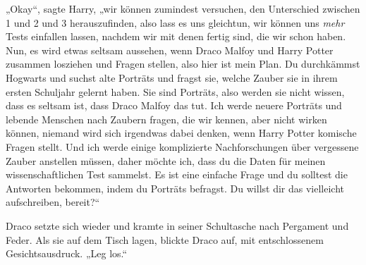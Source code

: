 „Okay“, sagte Harry, „wir können zumindest versuchen, den Unterschied zwischen 1 und 2 und 3 herauszufinden, also lass es uns gleichtun, wir können uns \emph{mehr} Tests einfallen lassen, nachdem wir mit denen fertig sind, die wir schon haben. Nun, es wird etwas seltsam aussehen, wenn Draco Malfoy und Harry Potter zusammen losziehen und Fragen stellen, also hier ist mein Plan. Du durchkämmst Hogwarts und suchst alte Porträts und fragst sie, welche Zauber sie in ihrem ersten Schuljahr gelernt haben. Sie sind Porträts, also werden sie nicht wissen, dass es seltsam ist, dass Draco Malfoy das tut. Ich werde neuere Porträts und lebende Menschen nach Zaubern fragen, die wir kennen, aber nicht wirken können, niemand wird sich irgendwas dabei denken, wenn Harry Potter komische Fragen stellt. Und ich werde einige komplizierte Nachforschungen über vergessene Zauber anstellen müssen, daher möchte ich, dass du die Daten für meinen wissenschaftlichen Test sammelst. Es ist eine einfache Frage und du solltest die Antworten bekommen, indem du Porträts befragst. Du willst dir das vielleicht aufschreiben, bereit?“

Draco setzte sich wieder und kramte in seiner Schultasche nach Pergament und Feder. Als sie auf dem Tisch lagen, blickte Draco auf, mit entschlossenem Gesichtsausdruck. „Leg los.“

